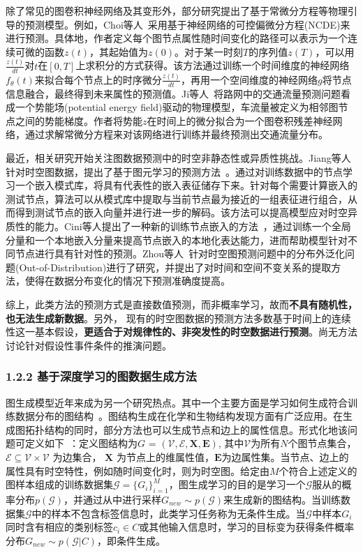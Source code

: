 \documentclass[12pt,UTF8,AutoFakeBold=2,a4paper]{ctexart} %
\begin{document}
除了常见的图卷积神经网络及其变形外，部分研究提出了基于常微分方程等物理引导的预测模型。例如，Choi等人~\cite{choi2022graph}采用基于神经网络的可控偏微分方程(NCDE)来进行预测。具体地，作者定义每个图节点属性随时间变化的路径可以表示为一个连续可微的函数$z(t)$，其起始值为$z(0)$。对于某一时刻$T$的序列值$z(T)$，可以用$\frac{z(t)}{dt}$对$t$在$[0,T]$上求积分的方式获得。该方法通过训练一个时间维度的神经网络$f_\theta(t)$来拟合每个节点上的时序微分$\frac{z(t)}{dt}$，再用一个空间维度的神经网络$g$将节点信息融合，最终得到未来属性的预测值。Ji等人~\cite{ji2022stden}将路网中的交通流量预测问题看成一个势能场(potential energy field)驱动的物理模型，车流量被定义为相邻图节点之间的势能梯度。作者将势能$z$在时间上的微分拟合为一个图卷积残差神经网络，通过求解常微分方程来对该网络进行训练并最终预测出交通流量分布。

最近，相关研究开始关注图数据预测中的时空非静态性或异质性挑战。Jiang等人针对时空图数据，提出了基于图元学习的预测方法~\cite{jiang2023spatio}。通过对训练数据中的节点学习一个嵌入模式库，将具有代表性的嵌入表征储存下来。针对每个需要计算嵌入的测试节点，算法可以从模式库中提取与当前节点最为接近的一组表征进行组合，从而得到测试节点的嵌入向量并进行进一步的解码。该方法可以提高模型应对时空异质性的能力。Cini等人提出了一种新的训练节点嵌入的方法~\cite{cini2023taming}，通过训练一个全局分量和一个本地嵌入分量来提高节点嵌入的本地化表达能力，进而帮助模型针对不同节点进行具有针对性的预测。Zhou等人~\cite{zhou2023maintaining}针对时空图预测问题中的分布外泛化问题(Out-of-Distribution)进行了研究，并提出了对时间和空间不变关系的提取方法，使得在数据分布变化的情况下预测准确度提高。

综上，此类方法的预测方式是直接数值预测，而非概率学习，故而\textbf{不具有随机性，也无法生成新数据}。另外，
现有的时空图数据的预测方法多数基于时间上的连续性这一基本假设，\textbf{更适合于对规律性的、非突发性的时空数据进行预测}。尚无方法讨论针对假设性事件条件的推演问题。

\subsubsection{1.2.2 基于深度学习的图数据生成方法}
图生成模型近年来成为另一个研究热点。其中一个主要方面是学习如何生成符合训练数据分布的图结构~\cite{guo2022systematic,zhu2022survey,li2018learning}。图结构生成在化学和生物结构发现方面有广泛应用。在生成图拓扑结构的同时，部分方法也可以生成节点和边上的属性信息。形式化地该问题可定义如下~\cite{zhu2022survey}：定义图结构为${G}$ = $\mathcal{(V, E, \mathbf{X}, \mathbf{E})}$, 其中$\mathcal{V}$为所有$N$个图节点集合，$\mathcal{E} \subseteq \mathcal{V}\times \mathcal{V}$ 为边集合，%
$\mathbf{X}$ %
为节点上的维属性值，$\mathbf{E}%
$为边属性集。当节点、边上的属性具有时空特性，例如随时间变化时，则为时空图。给定由$M$个符合上述定义的图样本组成的训练数据集$\mathcal{G} = \{G_i\}_{i=1}^M$，图生成学习的目的是学习一个$\mathcal{G}$服从的概率分布$p(\mathcal{G})$，并通过从中进行采样$G_{new}\sim p(\mathcal{G})$来生成新的图结构。当训练数据集$\mathcal{G}$中的样本不包含标签信息时，此类学习任务称为无条件生成。当$\mathcal{G}$中样本$G_i$同时含有相应的类别标签$c_i\in C$或其他输入信息时，学习的目标变为获得条件概率分布$G_{new}\sim p(\mathcal{G}|C)$，即条件生成。
\end{document}
